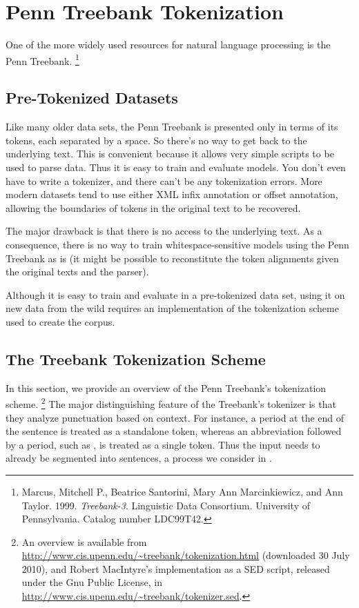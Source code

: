 \section{Penn Treebank Tokenization}

One of the more widely used resources for natural language
processing is the Penn Treebank.%
%
\footnote{Marcus, Mitchell P., Beatrice Santorini, Mary Ann
  Marcinkiewicz, and Ann Taylor. 1999. {\it Treebank-3}. Linguistic
  Data Consortium.  University of Pennsylvania.  Catalog number
  LDC99T42.}
%

\subsection{Pre-Tokenized Datasets}

Like many older data sets, the Penn Treebank is presented only in
terms of its tokens, each separated by a space.  So there's no way to
get back to the underlying text.  This is convenient because it allows
very simple scripts to be used to parse data.  Thus it is easy to
train and evaluate models.  You don't even have to write a tokenizer,
and there can't be any tokenization errors.  More modern datasets tend
to use either XML infix annotation or offset annotation, allowing the
boundaries of tokens in the original text to be recovered.

The major drawback is that there is no access to the underlying text.
As a consequence, there is no way to train whitespace-sensitive models
using the Penn Treebank as is (it might be possible to reconstitute
the token alignments given the original texts and the parser).

Although it is easy to train and evaluate in a pre-tokenized data
set, using it on new data from the wild requires an implementation
of the tokenization scheme used to create the corpus.

\subsection{The Treebank Tokenization Scheme}

In this section, we provide an overview of the Penn Treebank's
tokenization scheme.%
%
\footnote{An overview is available from
  \url{http://www.cis.upenn.edu/~treebank/tokenization.html}
  (downloaded 30 July 2010), and Robert MacIntyre's implementation as
  a SED script, released under the Gnu Public License, in
  \url{http://www.cis.upenn.edu/~treebank/tokenizer.sed}.}
%
The major distinguishing feature of the Treebank's tokenizer is that
they analyze punctuation based on context.  For instance, a period at
the end of the sentence is treated as a standalone token, whereas an
abbreviation followed by a period, such as , is
treated as a single token.  Thus the input needs to already be
segmented into sentences, a process we consider in
.

